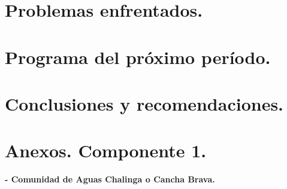 \documentclass[]{article}
\begin{document}
\clearpage
\section{Problemas enfrentados.}

\clearpage
\section{Programa del próximo período.}

\clearpage
\section{Conclusiones y recomendaciones.}

\clearpage
\section{Anexos. Componente 1.}

\textbf{- Comunidad de Aguas Chalinga o Cancha Brava.}
\end{document}
